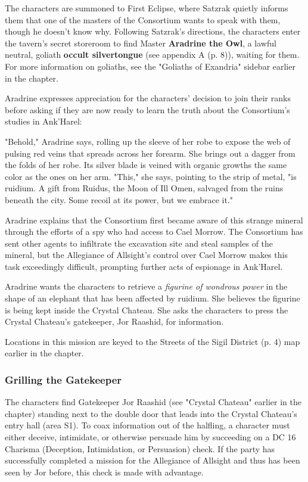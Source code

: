 \documentclass[letterpaper, 11pt, bg=full, twocolumn]{dndbook}
\begin{document}
The characters are summoned to First Eclipse, where Satzrak quietly informs them that one of the masters of the Consortium wants to speak with them, though he doesn't know why. Following Satzrak's directions, the characters enter the tavern's secret storeroom to find Master \textbf{Aradrine the Owl}, a lawful neutral, goliath \textbf{occult silvertongue} (see appendix A (p. 8)), waiting for them. For more information on goliaths, see the "Goliaths of Exandria" sidebar earlier in the chapter.

Aradrine expresses appreciation for the characters' decision to join their ranks before asking if they are now ready to learn the truth about the Consortium's studies in Ank'Harel:

\begin{DndReadAloud}
"Behold," Aradrine says, rolling up the sleeve of her robe to expose the web of pulsing red veins that spreads across her forearm. She brings out a dagger from the folds of her robe. Its silver blade is veined with organic growths the same color as the ones on her arm. "This," she says, pointing to the strip of metal, "is ruidium. A gift from Ruidus, the Moon of Ill Omen, salvaged from the ruins beneath the city. Some recoil at its power, but we embrace it."
\end{DndReadAloud}

Aradrine explains that the Consortium first became aware of this strange mineral through the efforts of a spy who had access to Cael Morrow. The Consortium has sent other agents to infiltrate the excavation site and steal samples of the mineral, but the Allegiance of Allsight's control over Cael Morrow makes this task exceedingly difficult, prompting further acts of espionage in Ank'Harel.

Aradrine wants the characters to retrieve a \textit{figurine of wondrous power} in the shape of an elephant that has been affected by ruidium. She believes the figurine is being kept inside the Crystal Chateau. She asks the characters to press the Crystal Chateau's gatekeeper, Jor Raashid, for information.

Locations in this mission are keyed to the Streets of the Sigil District (p. 4) map earlier in the chapter.

\subsubsection{Grilling the Gatekeeper}

The characters find Gatekeeper Jor Raashid (see "Crystal Chateau" earlier in the chapter) standing next to the double door that leads into the Crystal Chateau's entry hall (area S1). To coax information out of the halfling, a character must either deceive, intimidate, or otherwise persuade him by succeeding on a DC 16 Charisma (Deception, Intimidation, or Persuasion) check. If the party has successfully completed a mission for the Allegiance of Allsight and thus has been seen by Jor before, this check is made with advantage.
\end{document}
